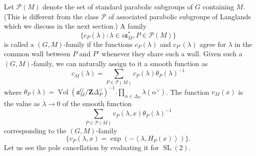 \documentclass[11pt]{amsart}
\def\Z{\mathbf Z}
\def\PPP{\mathcal P}
\def\aaa{\mathfrak a}
\def\sl{\operatorname{SL}}
\def\sprod#1#2{\left\langle #1 , #2 \right\rangle}  %
\def\vol{\operatorname{Vol}}
\theoremstyle{remark}
\begin{document}
Let $\PPP(M)$ denote the set of standard parabolic subgroups of $G$ containing $M$. (This is different from the class $\PPP$ of associated parabolic subgroups of Langlands which we discuss in the next section.) A family 
\[ \{c_P(\lambda) : \lambda \in i\aaa_M^*, P \in \PPP(M)\} \]
is called a $(G, M)$-family if the functions $c_P(\lambda)$ and $c_{P'}(\lambda)$ agree for $\lambda$ in the common wall between $P$ and $P'$ whenever they share such a wall. Given such a $(G, M)$-family, we can naturally assign to it a smooth function as
\[ c_M(\lambda) = \sum_{P \in \PPP(M)} c_P(\lambda) \theta_P(\lambda)^{-1} \]
where $\theta_P(\lambda) = \vol(\aaa_M^G / \Z \Delta_P^\vee)^{-1} . \displaystyle\prod_{\alpha \in \Delta_P} \lambda(\alpha^\vee)$. The function $v_M(x)$ is the value as $\lambda \to 0$ of the smooth function
\[ \sum_{P \in \PPP(M)} v_P(\lambda, x) \theta_P(\lambda)^{-1} \]
corresponding to the $(G, M)$-family 
\[ \{ v_P(\lambda, x) = \exp(-\sprod{\lambda}{H_P(x)}) \}. \]
Let us see the pole cancellation by evaluating it for $\sl(2)$. 
\end{document}
